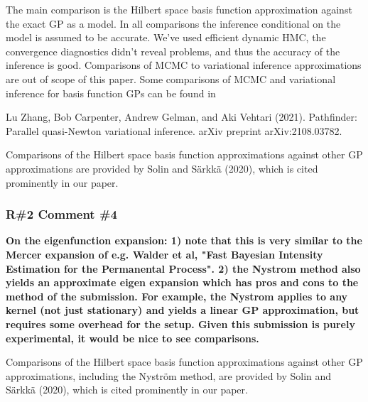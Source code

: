 \documentclass[11pt]{report}
\begin{document}
The main comparison is the Hilbert space basis function approximation against the exact GP as a model. In all comparisons the inference conditional on the model is assumed to be accurate. We've used efficient dynamic HMC, the convergence diagnostics didn't reveal problems, and thus the accuracy of the inference is good. Comparisons of MCMC to variational inference approximations are out of scope of this paper. Some comparisons of MCMC and variational inference for basis function GPs can be found in

Lu Zhang, Bob Carpenter, Andrew Gelman, and Aki Vehtari (2021). Pathfinder: Parallel quasi-Newton variational inference. arXiv preprint arXiv:2108.03782.

Comparisons of the Hilbert space basis function approximations against other GP approximations are provided by Solin and Särkkä (2020), which is cited prominently in our paper.


\subsubsection*{R\#2 Comment \#4}

\textbf{On the eigenfunction expansion: 1) note that this is very similar to the Mercer expansion of e.g. Walder et al, "Fast Bayesian Intensity Estimation for the Permanental Process". 2) the Nystrom method also yields an approximate eigen expansion which has pros and cons to the method of the submission. For example, the Nystrom applies to any kernel (not just stationary) and yields a linear GP approximation, but requires some overhead for the setup. Given this submission is purely experimental, it would be nice to see comparisons.} 

Comparisons of the Hilbert space basis function approximations against other GP approximations, including the Nyström method, are provided by Solin and Särkkä (2020), which is cited prominently in our paper.




\end{document}
